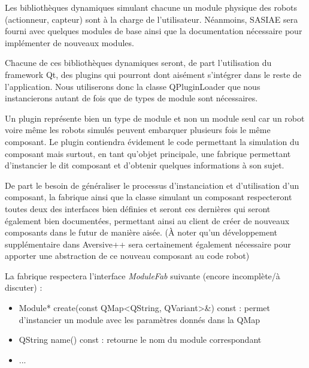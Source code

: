 
Les bibliothèques dynamiques simulant chacune un module physique des robots (actionneur, capteur) sont à la charge de l'utilisateur. Néanmoins, SASIAE sera fourni avec quelques modules de base ainsi que la documentation nécessaire pour implémenter de nouveaux modules.

Chacune de ces bibliothèques dynamiques seront, de part l'utilisation du framework Qt, des plugins qui pourront dont aisément s'intégrer dans le reste de l'application. Nous utiliserons donc la classe QPluginLoader que nous instancierons autant de fois que de types de module sont nécessaires.

Un plugin représente bien un type de module et non un module seul car un robot voire même les robots simulés peuvent embarquer plusieurs fois le même composant. Le plugin contiendra évidement le code permettant la simulation du composant mais surtout, en tant qu'objet principale, une fabrique permettant d'instancier le dit composant et d'obtenir quelques informations à son sujet.

De part le besoin de généraliser le processus d'instanciation et d'utilisation d'un composant, la fabrique ainsi que la classe simulant un composant respecteront toutes deux des interfaces bien définies et seront ces dernières qui seront également bien documentées, permettant ainsi au client de créer de nouveaux composants dans le futur de manière aisée. (\`A noter qu'un développement supplémentaire dans Aversive++ sera certainement également nécessaire pour apporter une abstraction de ce nouveau composant au code robot)

La fabrique respectera l'interface \emph{ModuleFab} suivante (encore incomplète/à discuter) :
\begin{itemize}
    \item Module* create(const QMap\textless QString, QVariant\textgreater \&) const : permet d'instancier un module avec les paramètres donnés dans la QMap
    \item QString name() const : retourne le nom du module correspondant
    \item ...
\end{itemize}

